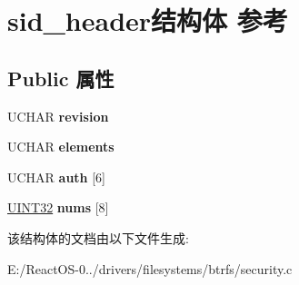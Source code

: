 \hypertarget{structsid__header}{}\section{sid\+\_\+header结构体 参考}
\label{structsid__header}
\subsection*{Public 属性}
\begin{DoxyCompactItemize}
\item 
\mbox{\label{structsid__header_a0b396f2a0f304ee7d98e4192d641d90f}} 
U\+C\+H\+AR {\bfseries revision}
\item 
\mbox{\label{structsid__header_aa08f758d902c346e5030af57c625c0c2}} 
U\+C\+H\+AR {\bfseries elements}
\item 
\mbox{\label{structsid__header_aca5609f79c04620063ffc950edfa420e}} 
U\+C\+H\+AR {\bfseries auth} \mbox{[}6\mbox{]}
\item 
\mbox{\label{structsid__header_a77c5c0865031cb0223251480117bc564}} 
\hyperlink{_processor_bind_8h_ae1e6edbbc26d6fbc71a90190d0266018}{U\+I\+N\+T32} {\bfseries nums} \mbox{[}8\mbox{]}
\end{DoxyCompactItemize}


该结构体的文档由以下文件生成\+:\begin{DoxyCompactItemize}
\item 
E\+:/\+React\+O\+S-\/0../drivers/filesystems/btrfs/security.\+c\end{DoxyCompactItemize}
